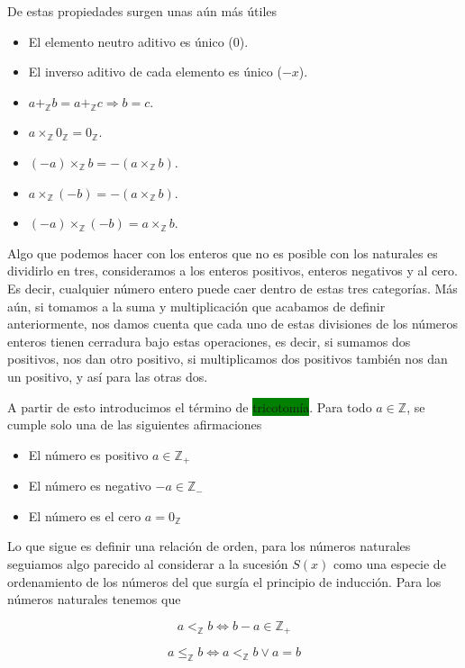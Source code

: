 \documentclass[11pt]{article}
\begin{document}
De estas propiedades surgen unas aún más útiles

\begin{itemize}
    \item El elemento neutro aditivo es único ($0$).
    \item El inverso aditivo de cada elemento es único ($-x$).
    \item $a+_{\mathbb Z}b=a+_{\mathbb Z}c
    \Longrightarrow b=c$.
    \item $a\times_{\mathbb Z}0_{\mathbb Z}=0_{\mathbb Z}$.
    \item $(-a)\times_{\mathbb Z}b
    =-(a\times_{\mathbb Z}b)$.
    \item $a\times_{\mathbb Z}(-b)
    =-(a\times_{\mathbb Z}b)$.
    \item $(-a)\times_{\mathbb Z}(-b)
    =a\times_{\mathbb Z}b$.
\end{itemize}

Algo que podemos hacer con los enteros que no es posible con los naturales es dividirlo en tres, consideramos a los enteros positivos, enteros negativos y al cero. Es decir, cualquier número entero puede caer dentro de estas tres categorías. Más aún, si tomamos a la suma y multiplicación que acabamos de definir anteriormente, nos damos cuenta que cada uno de estas divisiones de los números enteros tienen cerradura bajo estas operaciones, es decir, si sumamos dos positivos, nos dan otro positivo, si multiplicamos dos positivos también nos dan un positivo, y así para las otras dos.

A partir de esto introducimos el término de \colorbox{Green}{tricotomía}. Para todo $a\in\mathbb Z$, se cumple solo una de las siguientes afirmaciones

\begin{itemize}
    \item El número es positivo $a\in \mathbb Z_+$
    \item El número es negativo $-a\in \mathbb Z_-$
    \item El número es el cero $a=0_\mathbb Z$
\end{itemize}

Lo que sigue es definir una relación de orden, para los números naturales seguiamos algo parecido al considerar a la sucesión $S(x)$ como una especie de ordenamiento de los números del que surgía el principio de inducción. Para los números naturales tenemos que 

\[
a <_\mathbb Z b \iff b-a\in \mathbb Z_+
\]

\[
a \leq _\mathbb Z b\iff a <_\mathbb Z b \vee a=b
\]
\end{document}
